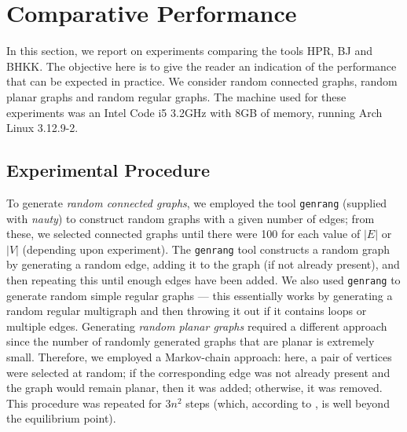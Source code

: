 

\section{Comparative Performance}  

In this section, we report on experiments comparing the tools HPR, BJ and BHKK.  The objective here is to give the reader an indication of the performance that can be expected in practice.  We consider random connected graphs, random planar graphs and random regular graphs.  The machine used for these experiments was an Intel Code i5 3.2GHz with 8GB of memory, running Arch Linux 3.12.9-2.

\subsection{Experimental Procedure}
To generate {\em random connected graphs}, we employed the tool \verb+genrang+ (supplied with {\em nauty}) to construct random graphs with a given number of edges; from these, we selected connected graphs until there were 100 for each value of $|E|$ or $|V|$ (depending upon experiment).  The \verb+genrang+ tool constructs a random graph by generating a random edge, adding it to the graph (if not already present), and then repeating this until enough edges have been added.  We also used \verb+genrang+ to generate random simple regular graphs --- this essentially works by generating a random regular multigraph and then throwing it out if it contains loops or multiple edges.  Generating {\em random planar graphs} required a different approach since the number of randomly generated graphs that are planar is extremely small.  Therefore, we employed a Markov-chain approach:  here, a pair of vertices were selected at random; if the corresponding edge was not already present and the graph would remain planar, then it was added; otherwise, it was removed.  This procedure was repeated for $3n^2$ steps (which, according to \cite{DVW96}, is well beyond the equilibrium point).

